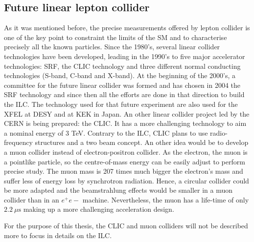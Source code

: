     \subsection{Future linear lepton collider}

    As it was mentioned before, the precise measurements offered by lepton collider is one of the key point to constraint the limits of the \gls{SM} and to characterise precisely all the known particles.
    Since the 1980's, several linear collider technologies have been developed, leading in the 1990's to five major accelerator technologies: \gls{SRF}, the \gls{CLIC} technology and three different normal conducting technologies (S-band, C-band and X-band).
    At the beginning of the 2000's, a committee for the future linear collider was formed and has chosen in 2004 the \gls{SRF} technology and since then all the efforts are done in that direction to build the \gls{ILC}.
    The technology used for that future experiment are also used for the XFEL at DESY and at KEK in Japan.
    An other linear collider project led by the CERN is being prepared: the \gls{CLIC}.
    It has a more challenging technology to aim a nominal energy of 3 TeV.
    Contrary to the \gls{ILC}, \gls{CLIC} plans to use radio-frequency structures and a two beam concept. 
    An other idea would be to develop a muon collider instead of electron-positron collider.
    As the electron, the muon is a pointlike particle, so the centre-of-mass energy can be easily adjust to perform precise study.
    The muon mass is 207 times much bigger the electron's mass and suffer less of energy loss by synchrotron radiation.
    Hence, a circular collider could be more adapted and the beamstrahlung effects would be smaller in a muon collider than in an $e^+e-$ machine.
    Nevertheless, the muon has a life-time of only $2.2 \ \mu\text{s}$ making up a more challenging acceleration design.
    

    For the purpose of this thesis, the \gls{CLIC} and muon colliders will not be described more to focus in details on the \gls{ILC}.
     
